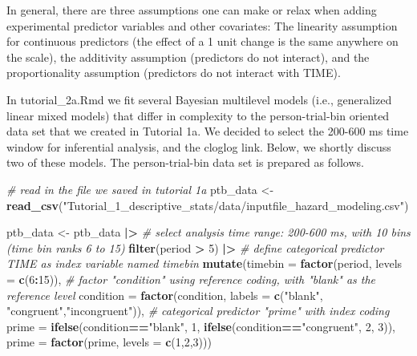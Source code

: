 \documentclass[
  english,
  man, donotrepeattitle,floatsintext]{apa6}
\newenvironment{Shaded}{\begin{snugshade}}{\end{snugshade}}
\newcommand{\AttributeTok}[1]{\textcolor[rgb]{0.13,0.29,0.53}{#1}}
\newcommand{\CommentTok}[1]{\textcolor[rgb]{0.56,0.35,0.01}{\textit{#1}}}
\newcommand{\DecValTok}[1]{\textcolor[rgb]{0.00,0.00,0.81}{#1}}
\newcommand{\FunctionTok}[1]{\textcolor[rgb]{0.13,0.29,0.53}{\textbf{#1}}}
\newcommand{\NormalTok}[1]{#1}
\newcommand{\OtherTok}[1]{\textcolor[rgb]{0.56,0.35,0.01}{#1}}
\newcommand{\SpecialCharTok}[1]{\textcolor[rgb]{0.81,0.36,0.00}{\textbf{#1}}}
\newcommand{\StringTok}[1]{\textcolor[rgb]{0.31,0.60,0.02}{#1}}
\begin{document}
In general, there are three assumptions one can make or relax when adding experimental predictor variables and other covariates: The linearity assumption for continuous predictors (the effect of a 1 unit change is the same anywhere on the scale), the additivity assumption (predictors do not interact), and the proportionality assumption (predictors do not interact with TIME).

In tutorial\_2a.Rmd we fit several Bayesian multilevel models (i.e., generalized linear mixed models) that differ in complexity to the person-trial-bin oriented data set that we created in Tutorial 1a. We decided to select the 200-600 ms time window for inferential analysis, and the cloglog link. Below, we shortly discuss two of these models. The person-trial-bin data set is prepared as follows.

\footnotesize

\begin{Shaded}
\begin{Highlighting}[]
\CommentTok{\# read in the file we saved in tutorial 1a}
\NormalTok{ptb\_data }\OtherTok{\textless{}{-}} \FunctionTok{read\_csv}\NormalTok{(}\StringTok{"Tutorial\_1\_descriptive\_stats/data/inputfile\_hazard\_modeling.csv"}\NormalTok{)}

\NormalTok{ptb\_data }\OtherTok{\textless{}{-}}\NormalTok{ ptb\_data }\SpecialCharTok{|\textgreater{}} 
\CommentTok{\# select analysis time range: 200{-}600 ms, with 10 bins (time bin ranks 6 to 15)}
\FunctionTok{filter}\NormalTok{(period }\SpecialCharTok{\textgreater{}} \DecValTok{5}\NormalTok{) }\SpecialCharTok{|\textgreater{}}
       \CommentTok{\# define categorical predictor TIME as index variable named timebin}
\FunctionTok{mutate}\NormalTok{(}\AttributeTok{timebin =} \FunctionTok{factor}\NormalTok{(period, }\AttributeTok{levels =} \FunctionTok{c}\NormalTok{(}\DecValTok{6}\SpecialCharTok{:}\DecValTok{15}\NormalTok{)),}
       \CommentTok{\# factor "condition" using reference coding, with "blank" as the reference level}
       \AttributeTok{condition =} \FunctionTok{factor}\NormalTok{(condition, }\AttributeTok{labels =} \FunctionTok{c}\NormalTok{(}\StringTok{"blank"}\NormalTok{, }\StringTok{"congruent"}\NormalTok{,}\StringTok{"incongruent"}\NormalTok{)),}
       \CommentTok{\# categorical predictor "prime" with index coding}
       \AttributeTok{prime =} \FunctionTok{ifelse}\NormalTok{(condition}\SpecialCharTok{==}\StringTok{"blank"}\NormalTok{, }\DecValTok{1}\NormalTok{, }\FunctionTok{ifelse}\NormalTok{(condition}\SpecialCharTok{==}\StringTok{"congruent"}\NormalTok{, }\DecValTok{2}\NormalTok{, }\DecValTok{3}\NormalTok{)),}
       \AttributeTok{prime =} \FunctionTok{factor}\NormalTok{(prime, }\AttributeTok{levels =} \FunctionTok{c}\NormalTok{(}\DecValTok{1}\NormalTok{,}\DecValTok{2}\NormalTok{,}\DecValTok{3}\NormalTok{)))}
\end{Highlighting}
\end{Shaded}
\end{document}
